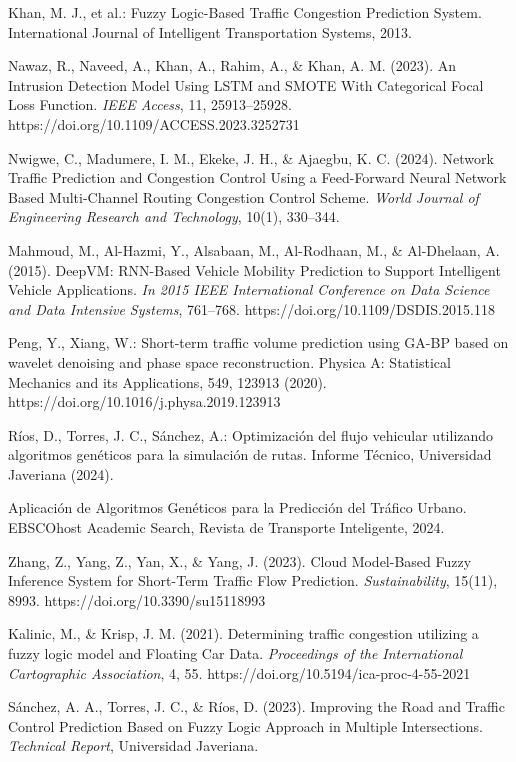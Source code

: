 \documentclass{svproc} %
\begin{document}
\begin{thebibliography}{99}
     Khan, M. J., et al.: Fuzzy Logic-Based Traffic Congestion Prediction System. International Journal of Intelligent Transportation Systems, 2013.

    Nawaz, R., Naveed, A., Khan, A., Rahim, A., \& Khan, A. M. (2023). 
    An Intrusion Detection Model Using LSTM and SMOTE With Categorical Focal Loss Function. 
    \textit{IEEE Access}, 11, 25913–25928. https://doi.org/10.1109/ACCESS.2023.3252731

    Nwigwe, C., Madumere, I. M., Ekeke, J. H., \& Ajaegbu, K. C. (2024). 
    Network Traffic Prediction and Congestion Control Using a Feed-Forward Neural Network Based Multi-Channel Routing Congestion Control Scheme. 
    \textit{World Journal of Engineering Research and Technology}, 10(1), 330–344.

    Mahmoud, M., Al-Hazmi, Y., Alsabaan, M., Al-Rodhaan, M., \& Al-Dhelaan, A. (2015). 
    DeepVM: RNN-Based Vehicle Mobility Prediction to Support Intelligent Vehicle Applications. 
    \textit{In 2015 IEEE International Conference on Data Science and Data Intensive Systems}, 761–768. https://doi.org/10.1109/DSDIS.2015.118

Peng, Y., Xiang, W.: Short-term traffic volume prediction using GA-BP based on wavelet denoising and phase space reconstruction. Physica A: Statistical Mechanics and its Applications, 549, 123913 (2020). https://doi.org/10.1016/j.physa.2019.123913

    Ríos, D., Torres, J. C., Sánchez, A.: Optimización del flujo vehicular utilizando algoritmos genéticos para la simulación de rutas. Informe Técnico, Universidad Javeriana (2024).

    Aplicación de Algoritmos Genéticos para la Predicción del Tráfico Urbano. EBSCOhost Academic Search, Revista de Transporte Inteligente, 2024.

    Zhang, Z., Yang, Z., Yan, X., \& Yang, J. (2023). 
    Cloud Model-Based Fuzzy Inference System for Short-Term Traffic Flow Prediction. 
    \textit{Sustainability}, 15(11), 8993. https://doi.org/10.3390/su15118993

    Kalinic, M., \& Krisp, J. M. (2021). 
    Determining traffic congestion utilizing a fuzzy logic model and Floating Car Data. 
    \textit{Proceedings of the International Cartographic Association}, 4, 55. https://doi.org/10.5194/ica-proc-4-55-2021

    Sánchez, A. A., Torres, J. C., \& Ríos, D. (2023). 
    Improving the Road and Traffic Control Prediction Based on Fuzzy Logic Approach in Multiple Intersections. 
    \textit{Technical Report}, Universidad Javeriana.
  
  \end{thebibliography}
\end{document}
